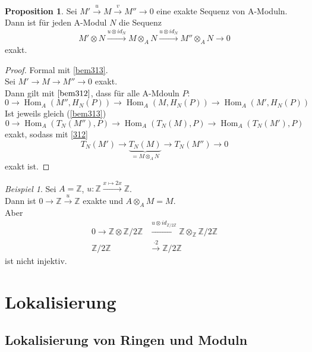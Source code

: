 \documentclass[10pt,a4paper]{article}
\newcommand{\Z}{\ensuremath{\mathbb{Z}}}
\newcommand{\Hom}{\operatorname{Hom}}
\newcounter{thm}[section]
\theoremstyle{definition}
\newtheorem{prop}[thm]{Proposition}
\theoremstyle{plain}
\theoremstyle{remark}
\newtheorem{exm}[thm]{Beispiel}
\begin{document}
\begin{prop}
	Sei $M'\xrightarrow{u}M\xrightarrow{v}M''\rightarrow 0$ eine exakte Sequenz von A-Moduln. Dann ist für jeden A-Modul $N$ die Sequenz
	\[M'\otimes N\xrightarrow{u\otimes id_N}M\otimes_AN\xrightarrow{u\otimes id_N}M''\otimes_A N\rightarrow 0\]
	exakt.
\end{prop}
\begin{proof}
	Formal mit \ref{bem313}.\\
	Sei $M'\rightarrow M \rightarrow M''\rightarrow 0$ exakt.\\
	Dann gilt mit $\ref{bem312}$, dass für alle A-Mdouln $P$:
	\[0\rightarrow \Hom_A(M'',H_N(P))\rightarrow \Hom_A(M,H_N(P))\rightarrow \Hom_A(M',H_N(P))\]
	Ist jeweils gleich (\ref{bem313})
	\[0\rightarrow \Hom_A(T_N(M''),P)\rightarrow \Hom_A(T_N(M),P)\rightarrow \Hom_A(T_N(M'),P)\]
	exakt, sodass mit \ref{312}
	\[T_N(M')\rightarrow \underbrace{T_N(M)}_{=M\otimes_AN}\rightarrow T_N(M'')\rightarrow 0\]
	exakt ist.
\end{proof}
\begin{exm}
	Sei $A=\Z$, $u:\Z\xrightarrow{x\mapsto2x}\Z$. \\
	Dann ist $0\rightarrow \Z\xrightarrow{u}\Z$ exakte und $A\otimes_A M=M$.\\
	Aber 
	\begin{align*}
	0\rightarrow \Z\otimes\Z/2\Z&\xrightarrow{u\otimes id_{\Z/2\Z}}\Z\otimes_\Z\Z/2\Z\\
	\Z/2\Z&\xrightarrow{\cdot 2}\Z/2\Z
	\end{align*}
	ist nicht injektiv.
\end{exm}
\section{Lokalisierung}
\subsection{Lokalisierung von Ringen und Moduln}
\end{document}
